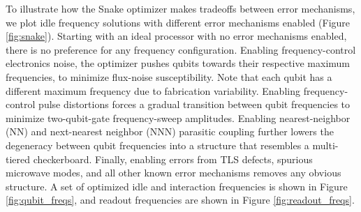 To illustrate how the Snake optimizer makes tradeoffs between error mechanisms, we plot idle frequency solutions with different error mechanisms enabled (Figure \ref{fig:snake}). Starting with an ideal processor with no error mechanisms enabled, there is no preference for any frequency configuration. Enabling frequency-control electronics noise, the optimizer pushes qubits towards their respective maximum frequencies, to minimize flux-noise susceptibility. Note that each qubit has a different maximum frequency due to fabrication variability. Enabling frequency-control pulse distortions forces a gradual transition between qubit frequencies to minimize two-qubit-gate frequency-sweep amplitudes. Enabling nearest-neighbor (NN) and next-nearest neighbor (NNN) parasitic coupling further lowers the degeneracy between qubit frequencies into a structure that resembles a multi-tiered checkerboard. Finally, enabling errors from TLS defects, spurious microwave modes, and all other known error mechanisms removes any obvious structure. A set of optimized idle and interaction frequencies is shown in Figure \ref{fig:qubit_freqs}, and readout frequencies are shown in Figure \ref{fig:readout_freqs}. 

